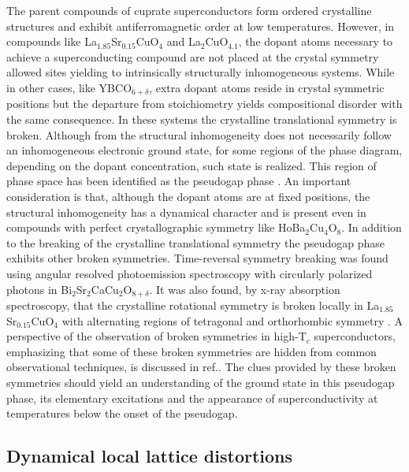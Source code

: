 The parent compounds of cuprate superconductors form ordered crystalline structures and exhibit antiferromagnetic order at low temperatures. However,  in compounds like La$_{1.85}$Sr$_{0.15}$CuO$_{4}$ and La$_{2}$CuO$_{4.1}$, the dopant atoms necessary to achieve a superconducting compound are not placed at the crystal symmetry allowed sites yielding to intrinsically structurally inhomogeneous systems\cite{Poccia2011}. While in other cases, like YBCO$_{6+\delta}$, extra dopant atoms reside in crystal symmetric positions but the departure from stoichiometry yields compositional disorder\cite{Chen1988} \cite{Andersen1990} with the same consequence. In these systems the crystalline translational symmetry is broken. Although from the structural inhomogeneity does not necessarily follow an inhomogeneous electronic ground state, for some regions of the phase diagram, depending on the dopant concentration, such state is realized. This region of phase space has been identified as the pseudogap phase\cite{Kresin2009} \cite{Muller2007} \cite{Timusk1999}. An important consideration is that, although the dopant atoms are at fixed positions, the structural inhomogeneity has a dynamical character\cite{Mihailovic2005} \cite{Bianconi1996} and is present even in compounds with perfect crystallographic symmetry like HoBa$_{2}$Cu$_{4}$O$_{8}$\cite{RubioTemprano2000}. In addition to the breaking of the crystalline translational symmetry the pseudogap phase exhibits other broken symmetries. Time-reversal symmetry breaking was found using angular resolved photoemission spectroscopy with circularly polarized photons in Bi$_{2}$Sr$_{2}$CaCu$_{2}$O$_{8+\delta}$\cite{Kaminski2002}.  
It was also found, by x-ray absorption spectroscopy, that the crystalline rotational symmetry is broken locally in La$_{1.85}$Sr$_{0.15}$CuO$_{4}$ with alternating regions of tetragonal and orthorhombic symmetry \cite{Bianconi1996}. A perspective of the observation of broken symmetries in high-T$_{c}$ superconductors, emphasizing that some of these broken symmetries are hidden from common observational techniques, is discussed in ref.\cite{Chakravarty2011}. The clues provided by these broken symmetries should yield an understanding of the ground state in this pseudogap phase, its elementary excitations and the appearance of superconductivity at temperatures below the onset of the pseudogap. 

\subsection{Dynamical local lattice distortions}

